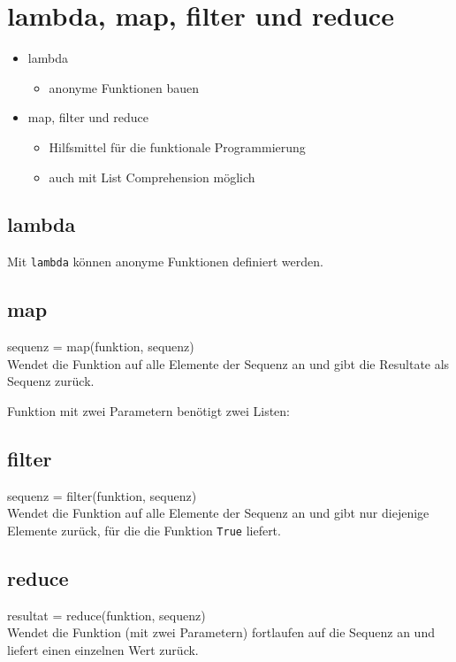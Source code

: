 \section{lambda, map, filter und reduce}
\begin{itemize}
	\item lambda
	\begin{itemize}
		\item anonyme Funktionen bauen
	\end{itemize}
	\item map, filter und reduce
	\begin{itemize}
		\item Hilfsmittel für die funktionale Programmierung
		\item auch mit List Comprehension möglich
	\end{itemize}
\end{itemize}

\subsection{lambda}
Mit \texttt{lambda} können anonyme Funktionen definiert werden.


\subsection{map}
sequenz = map(funktion, sequenz)\\
Wendet die Funktion auf alle Elemente der Sequenz an und gibt die Resultate als Sequenz zurück.

Funktion mit zwei Parametern benötigt zwei Listen:


\subsection{filter}
sequenz = filter(funktion, sequenz)\\
Wendet die Funktion auf alle Elemente der Sequenz an und gibt nur diejenige Elemente zurück, für die die Funktion \texttt{True} liefert.


\subsection{reduce}
resultat = reduce(funktion, sequenz)\\
Wendet die Funktion (mit zwei Parametern) fortlaufen auf die Sequenz an und liefert einen einzelnen Wert zurück.
